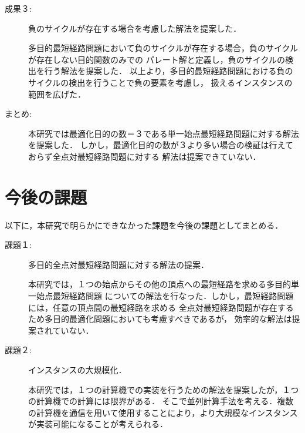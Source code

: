 \documentclass[12pt]{optlab-bachelor}
\renewcommand{\bibname}{参考文献}
\begin{document}
\begin{description}
  \item[成果３:]
  負のサイクルが存在する場合を考慮した解法を提案した．

  多目的最短経路問題において負のサイクルが存在する場合，負のサイクルが存在しない目的関数のみでの
  パレート解と定義し，負のサイクルの検出を行う解法を提案した．
  以上より，多目的最短経路問題における負のサイクルの検出を行うことで負の要素を考慮し，
  扱えるインスタンスの範囲を広げた．
\end{description}

\begin{description}
  \item[まとめ:]
  本研究では最適化目的の数＝３である単一始点最短経路問題に対する解法を提案した．
  しかし，最適化目的の数が３より多い場合の検証は行えておらず全点対最短経路問題に対する
  解法は提案できていない．
\end{description}

\section{今後の課題}
以下に，本研究で明らかにできなかった課題を今後の課題としてまとめる．

\begin{description}
  \item[課題１:]
  多目的全点対最短経路問題に対する解法の提案．

  本研究では，１つの始点からその他の頂点への最短経路を求める多目的単一始点最短経路問題
  についての解法を行なった．しかし，最短経路問題には，任意の頂点間の最短経路を求める
  全点対最短経路問題が存在するため多目的最適化問題においても考慮すべきであるが，
  効率的な解法は提案されていない．

\end{description}



\begin{description}
  \item[課題２:]
  インスタンスの大規模化．

  本研究では，１つの計算機での実装を行うための解法を提案したが，１つの計算機での計算には限界がある．
  そこで並列計算手法を考える．複数の計算機を通信を用いて使用することにより，より大規模なインスタンス
  が実装可能になることが考えられる．

\end{description}



\addcontentsline{toc}{chapter}{\bibname}

\appendix
\end{document}
